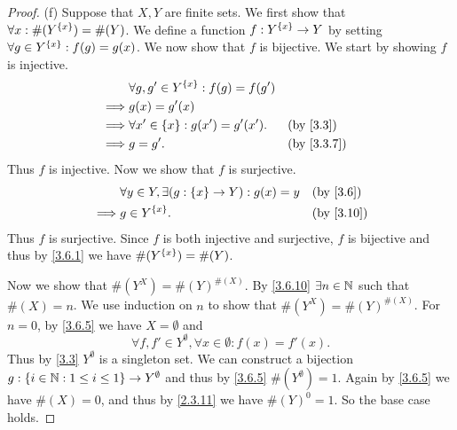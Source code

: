 \begin{proof}{(f)}
	Suppose that \(X, Y\) are finite sets.
	We first show that \(\forall x : \#(Y^{\left\lbrace x\right\rbrace}) = \#(Y)\).
	We define a function \(f : Y^{\left\lbrace x\right\rbrace} \to Y\) by setting \(\forall g \in Y^{\left\lbrace x\right\rbrace} : f(g) = g(x)\).
	We now show that \(f\) is bijective.
	We start by showing \(f\) is injective.
	\begin{align*}
		         & \forall g, g' \in Y^{\set{x}} : f(g) = f(g')                 \\
		\implies & g(x) = g'(x)                                                 \\
		\implies & \forall x' \in \set{x} : g(x') = g'(x').     &  & \by{3.3}   \\
		\implies & g = g'.                                      &  & \by{3.3.7}
	\end{align*}
	Thus \(f\) is injective.
	Now we show that \(f\) is surjective.
	\begin{align*}
		         & \forall y \in Y, \exists (g : \set{x} \to Y) : g(x) = y &  & \by{3.6}  \\
		\implies & g \in Y^{\set{x}}.                                      &  & \by{3.10}
	\end{align*}
	Thus \(f\) is surjective.
	Since \(f\) is both injective and surjective, \(f\) is bijective and thus by \cref{3.6.1} we have \(\#(Y^{\left\lbrace x\right\rbrace}) = \#(Y)\).

	Now we show that \(\#(Y^X) = \#(Y)^{\#(X)}\).
	By \cref{3.6.10} \(\exists n \in \mathbb{N}\) such that \(\#(X) = n\).
	We use induction on \(n\) to show that \(\#(Y^X) = \#(Y)^{\#(X)}\).
	For \(n = 0\), by \cref{3.6.5} we have \(X = \emptyset\) and
	\[
		\forall f, f' \in Y^\emptyset, \forall x \in \emptyset : f(x) = f'(x).
	\]
	Thus by \cref{3.3} \(Y^\emptyset\) is a singleton set.
	We can construct a bijection \(g : \left\lbrace i \in \mathbb{N} : 1 \leq i \leq 1\right\rbrace \to Y^\emptyset\) and thus by \cref{3.6.5} \(\#(Y^\emptyset) = 1\).
	Again by \cref{3.6.5} we have \(\#(X) = 0\), and thus by \cref{2.3.11} we have \(\#(Y)^0 = 1\).
	So the base case holds.


\end{proof}

